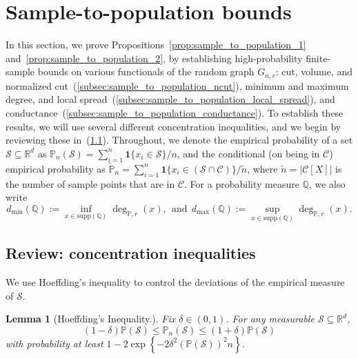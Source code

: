 \documentclass{article}
\newcommand{\Reals}{\mathbb{R}}
\newcommand{\set}[1]{\left\{#1\right\}}
\newcommand{\1}{\mathbf{1}}
\newcommand{\Rd}{\Reals^d}
\newcommand{\mc}[1]{\mathcal{#1}}
\newcommand{\mbb}[1]{\mathbb{#1}}
\newcommand{\Pbb}{\mathbb{P}}
\newcommand{\Qbb}{\mathbb{Q}}
\newcommand{\wt}[1]{\widetilde{#1}}
\newtheorem{lemma}{Lemma}[section]
\theoremstyle{definition}
\theoremstyle{remark}
\begin{document}
\section{Sample-to-population bounds}
\label{sec:sample_to_population}
In this section, we prove Propositions~\ref{prop:sample_to_population_1} and~\ref{prop:sample_to_population_2}, by establishing high-probability finite-sample bounds on various functionals of the random graph $G_{n,r}$: cut, volume, and normalized cut~(\ref{subsec:sample_to_population_ncut}), minimum and maximum degree, and local spread~(\ref{subsec:sample_to_population_local_spread}), and conductance~(\ref{subsec:sample_to_population_conductance}). To establish these results, we will use several different concentration inequalities, and we begin by reviewing these in~(\ref{subsec:concentration}). Throughout, we denote the empirical probability of a set $\mc{S} \subseteq \Rd$ as $\Pbb_n(\mc{S}) = \sum_{i = 1}^{n} \1\{x_i \in \mc{S}\}/n$, and the conditional (on being in $\mc{C}$) empirical probability as $\wt{\Pbb}_n = \sum_{i = 1}^{n} \1\{x_i \in (\mc{S} \cap \mc{C})\}/\wt{n}$, where $\wt{n} = |\mc{C}[X]|$ is the number of sample points that are in $\mc{C}$. For a probability measure $\Qbb$, we also write
\begin{equation}
\label{eqn:population_minmax_degree}
d_{\min}(\Qbb) := \inf_{x \in \mathrm{supp}(\mbb{Q})} \deg_{\Pbb,r}(x),~~\textrm{and}~~d_{\max}(\Qbb) := \sup_{x \in \mathrm{supp}(\mbb{Q})} \deg_{\Pbb,r}(x).
\end{equation}

\subsection{Review: concentration inequalities}
\label{subsec:concentration}
We use Hoeffding's inequality to control the deviations of the empirical measure of $\mc{S}$.
\begin{lemma}[Hoeffding's Inequality.]
	\label{lem:hoeffding_2}
	Fix $\delta \in (0,1)$. For any measurable $\mc{S} \subseteq \Rd$,
	\begin{equation*}
	(1 - \delta) \Pbb(\mathcal{S}) \leq \Pbb_n(\mathcal{S}) \leq (1 + \delta)\Pbb(\mathcal{S})
	\end{equation*}
	with probability at least $1 - 2\exp\set{-2\delta^2(\Pbb(\mathcal{S}))^2n}$. 
\end{lemma}
\end{document}
